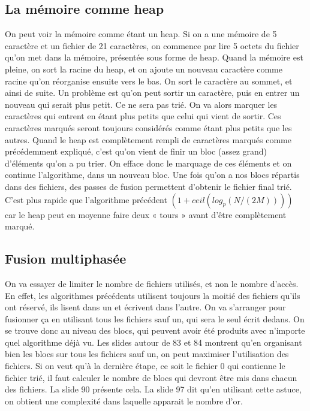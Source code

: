 \documentclass[10pt]{article}
\begin{document}
\subsection{La mémoire comme heap}
On peut voir la mémoire comme étant un heap. Si on a une mémoire de 5 caractère et un fichier de 21 caractères, on commence par lire 5 octets du fichier qu'on met dans la mémoire, présentée sous forme de heap. 
\newline \newline 
Quand la mémoire est pleine, on sort la racine du heap, et on ajoute un nouveau caractère comme racine qu'on réorganise ensuite vers le bas. On sort le caractère au sommet, et ainsi de suite. Un problème est qu'on peut sortir un caractère, puis en entrer un nouveau qui serait plus petit. Ce ne sera pas trié. On va alors marquer les caractères qui entrent en étant plus petits que celui qui vient de sortir. Ces caractères marqués seront toujours considérés comme étant plus petits que les autres.  
\newline \newline 
Quand le heap est complètement rempli de caractères marqués comme précédemment expliqué, c'est qu'on vient de finir un bloc (assez grand) d'éléments qu'on a pu trier. On efface donc le marquage de ces éléments et on continue l'algorithme, dans un nouveau bloc.  
\newline \newline 
Une fois qu'on a nos blocs répartis dans des fichiers, des passes de fusion permettent d'obtenir le fichier final trié. C'est plus rapide que l'algorithme précédent $(1+ceil(log_p(N/(2M))))$ car le heap peut en moyenne faire deux « tours » avant d'être complètement marqué.
\subsection{Fusion multiphasée}
On va essayer de limiter le nombre de fichiers utilisés, et non le nombre d'accès. En effet, les algorithmes précédents utilisent toujours la moitié des fichiers qu'ils ont réservé, ils lisent dans un et écrivent dans l'autre. On va s'arranger pour fusionner ça en utilisant tous les fichiers sauf un, qui sera le seul écrit dedans.  
\newline \newline 
On se trouve donc au niveau des blocs, qui peuvent avoir été produits avec n'importe quel algorithme déjà vu. Les slides autour de 83 et 84 montrent qu'en organisant bien les blocs sur tous les fichiers sauf un, on peut maximiser l'utilisation des fichiers. Si on veut qu'à la dernière étape, ce soit le fichier 0 qui contienne le fichier trié, il faut calculer le nombre de blocs qui devront être mis dans chacun des fichiers. La slide 90 présente cela. La slide 97 dit qu'en utilisant cette astuce, on obtient une complexité dans laquelle apparait le nombre d'or.
\newpage
\end{document}
